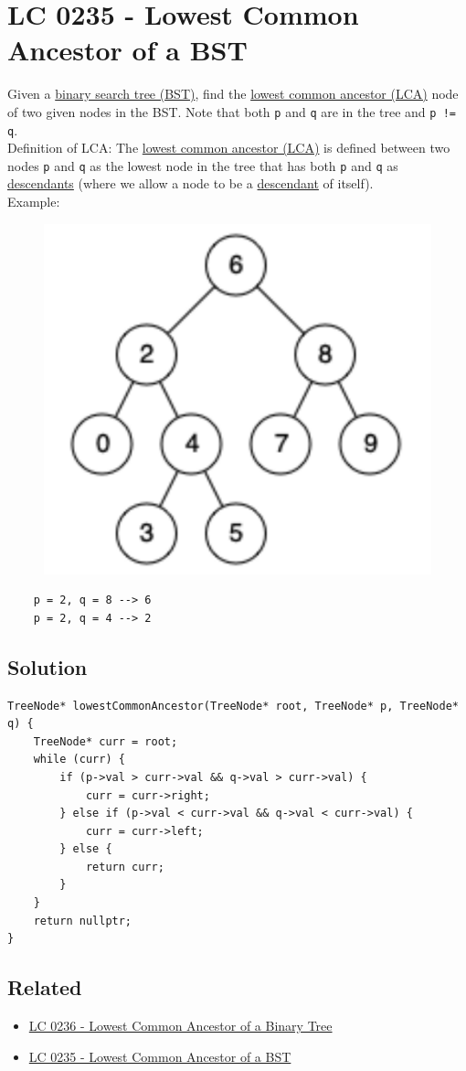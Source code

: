 \section{LC 0235 - Lowest Common Ancestor of a BST}\label{lc0235}
Given a \ul{binary search tree (BST)}, find the \ul{lowest common ancestor (LCA)} node of two given nodes in the BST. Note that both {\colorbox{CodeBackground}{\lstinline|p|}} and {\colorbox{CodeBackground}{\lstinline|q|}} are in the tree and {\colorbox{CodeBackground}{\lstinline|p != q|}}.\\

Definition of LCA: The \ul{lowest common ancestor (LCA)} is defined between two nodes {\colorbox{CodeBackground}{\lstinline|p|}} and {\colorbox{CodeBackground}{\lstinline|q|}} as the lowest node in the tree that has both {\colorbox{CodeBackground}{\lstinline|p|}} and {\colorbox{CodeBackground}{\lstinline|q|}} as \ul{descendants} (where we allow a node to be a \ul{descendant} of itself). \\

Example:

\begin{figure}[H]
	\centering
	\includegraphics[width=0.3\linewidth]{images/lc0235_example}
	\label{fig:lc0235example}
\end{figure}
\begin{lstlisting}
	p = 2, q = 8 --> 6
	p = 2, q = 4 --> 2
\end{lstlisting}

\subsection*{Solution}
\begin{lstlisting}
TreeNode* lowestCommonAncestor(TreeNode* root, TreeNode* p, TreeNode* q) {
	TreeNode* curr = root;
	while (curr) {
		if (p->val > curr->val && q->val > curr->val) {
			curr = curr->right;
		} else if (p->val < curr->val && q->val < curr->val) {
			curr = curr->left;
		} else {
			return curr;
		}
	}
	return nullptr;
}
\end{lstlisting}

\subsection*{Related}
\begin{itemize}
	\item \hyperref[lc0236]{LC 0236 - Lowest Common Ancestor of a Binary Tree}
	\item \hyperref[lc0235]{LC 0235 - Lowest Common Ancestor of a BST}
\end{itemize}

